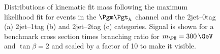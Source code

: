 \begin{figure}
\begin{center}

\end{center}
\caption[Distributions of kinematic fit mass following the maximum likelihood fit for
events in the $\mutau$ channel.]{
Distributions of kinematic fit mass following the maximum likelihood fit for
events in the $\mutau$ channel and the 2jet--0tag (a) 2jet--1tag (b) and 
2jet--2tag (c) categories. Signal is shown for a benchmark
cross section times branching ratio for $m_{\PH}=300\,\GeV$ and $\tan\beta=2$
and scaled by a factor of 10 to make it visible.}
\label{fig:PostFitMHmutau}
\end{figure} 


